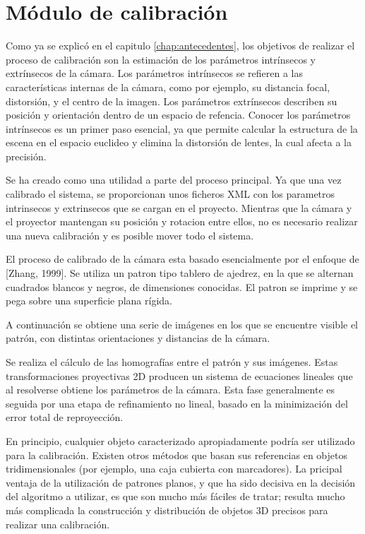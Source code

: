 \section{Módulo de calibración}
Como ya se explicó en el capitulo \ref{chap:antecedentes}, los objetivos de realizar el proceso de calibración son la estimación de los parámetros intrínsecos y extrínsecos de la cámara. Los parámetros intrínsecos se refieren a las características internas de la cámara, como por ejemplo, su distancia focal, distorsión, y el centro de la imagen. Los parámetros extrínsecos describen su posición y orientación dentro de un espacio de refencia. Conocer los parámetros intrínsecos es un primer paso esencial, ya que permite calcular la estructura de la escena en el espacio euclideo y elimina la distorsión de lentes, la cual afecta a la precisión.

Se ha creado como una utilidad a parte del proceso principal. Ya que una vez calibrado el sistema, se proporcionan unos ficheros XML con los parametros intrinsecos y extrinsecos que se cargan en el proyecto. Mientras que la cámara y el proyector mantengan su posición y rotacion entre ellos, no es necesario realizar una nueva calibración y es posible mover todo el sistema.

El proceso de calibrado de la cámara esta basado esencialmente por el enfoque de [Zhang, 1999]. Se utiliza un patron tipo tablero de ajedrez, en la que se alternan cuadrados blancos y negros, de dimensiones conocidas. El patron se imprime y se pega sobre una superficie plana rígida.

A continuación se obtiene una serie de imágenes en los que se encuentre visible el patrón, con distintas orientaciones y distancias de la cámara. 

Se realiza el cálculo de las homografías entre el patrón y sus imágenes. Estas transformaciones proyectivas 2D producen un sistema de ecuaciones lineales que al resolverse obtiene los parámetros de la cámara. Esta fase generalmente es seguida por una etapa de refinamiento no lineal, basado en la minimización del error total de reproyección.

En principio, cualquier objeto caracterizado apropiadamente podría ser utilizado para la calibración. Existen otros métodos que basan sus referencias en objetos tridimensionales (por ejemplo, una caja cubierta con marcadores).  
La pricipal ventaja de la utilización de patrones planos, y que ha sido decisiva en la decisión del algoritmo a utilizar, es que son mucho más fáciles de tratar; resulta mucho más complicada la construcción y distribución de objetos 3D precisos para realizar una calibración.

